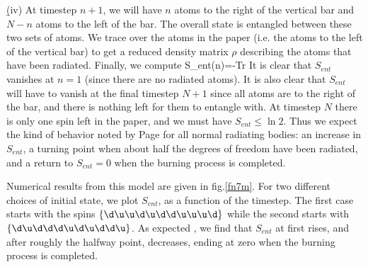 \documentclass[11pt]{article}
\begin{document}
\b

(iv) At timestep $n+1$, we will have $n$ atoms to the right of the vertical bar and $N-n$ atoms to the left of the bar. The overall state is entangled between these two sets of atoms. We trace over the atoms in the paper (i.e. the atoms to the left of the vertical bar) to get a reduced density matrix $\rho$ describing the atoms that have been radiated. Finally, we compute
\be
S_{ent}(n)=-Tr \rho\ln \rho
\ee
It is clear that $S_{ent}$ vanishes at $n=1$ (since there are no radiated atoms). It is also clear that $S_{ent}$ will have to vanish at the final timestep $N+1$ since all atoms are to the right of the bar, and there is nothing left for them to entangle with. At timestep $N$ there is only one spin left in the paper, and we must have $S_{ent}\le \ln 2$. Thus we expect the kind of behavior noted by Page \cite{page} for all normal radiating bodies: an increase in $S_{ent}$, a turning point when about half the degrees of freedom have been radiated, and a return to $S_{ent}=0$ when the burning process is completed. 

Numerical results from this model are given in fig.\ref{fn7m}. For two different choices of initial state, we plot $S_{ent}$, as a function of the timestep. The first case starts with the spins $\{\d\u\u\d\u\d\d\u\u\u\d\}$ while the second starts with 
$\{\d\u\d\d\d\u\d\u\d\d\u \} $. As expected \cite{page}, we find that $S_{ent}$ at first rises, and after roughly the halfway point, decreases, ending at zero when the burning process is completed. 
\end{document}
